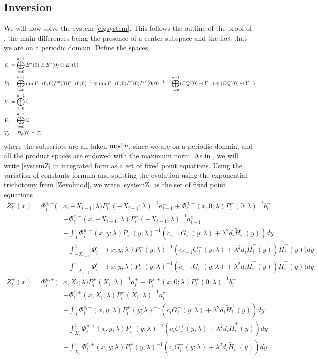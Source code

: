 \documentclass[10pt,reqno]{amsart}
\theoremstyle{plain}
\theoremstyle{definition}
\theoremstyle{remark}
\numberwithin{theorem}{section}
\numberwithin{equation}{section}
\begin{document}
\subsection{Inversion}

We will now solve the system \cref{eigsystem}. This follows the outline of the proof of \cite[Theorem 2]{Sandstede1998}, the main differences being the presence of a center subspace and the fact that we are on a periodic domain. Define the spaces
\begin{align*}
V_a &= \bigoplus_{i=0}^{n-1} E^u(0) \oplus E^s(0) \oplus E^c(0) \\
V_b &= \bigoplus_{i=0}^{n-1} \operatorname{ran} P^-(0; 0) P^u(0) P^-(0; 0)^{-1} \oplus \operatorname{ran} P^+(0; 0) P^s(0) P^+(0; 0)^{-1} = \bigoplus_{i=0}^{n-1} (\mathbb{C} Q'(0)\oplus Y^-)\oplus(\mathbb{C} Q'(0)\oplus Y^+)\\
V_c &= \bigoplus_{i=0}^{n-1} \mathbb{C} \\
V_d &= \bigoplus_{i=0}^{n-1} \mathbb{C} \\
V_\lambda &= B_\delta(0) \subset \mathbb{C}
\end{align*}
where the subscripts are all taken $\mathop\mathrm{mod}\nolimits n$, since we are on a periodic domain, and all the product spaces are endowed with the maximum norm. As in \cite{Sandstede1998}, we will write \eqref{systemZ} in integrated form as a set of fixed point equations. Using the variation of constants formula and splitting the evolution using the exponential trichotomy from \cref{Zevolmod}, we write \eqref{systemZ} as the set of fixed point equations
\begin{equation}\label{Zfpeq}
\begin{aligned}
Z_i^-(x) = \Phi_i^{s,-}(&x, -X_{i-1}; \lambda) P_i^-(-X_{i-1}; \lambda)^{-1} a_{i-1}^- + \Phi_i^{u,-}(x, 0; \lambda) P_i^-(0; \lambda)^{-1} b_i^- \\
&- \Phi_i^{c,-}(x, -X_{i-1}; \lambda) P_i^-(-X_{i-1}; \lambda)^{-1} a_{i-1}^c \\
&+ \int_0^x \Phi_i^{u,-}(x, y; \lambda)P_i^-(y; \lambda)^{-1}(c_{i-1} G_i^-(y; \lambda) + \lambda^2 d_i \tilde{H}_i^-(y)) dy \\
&+ \int_{-X_{i-1}}^x \Phi_i^{s,-}(x, y; \lambda) P_i^-(y; \lambda)^{-1} (c_{i-1} G_i^-(y; \lambda) + \lambda^2 d_i \tilde{H}_i^-(y)) \tilde{H}_i^-(y)) dy \\
&+ \int_{-X_{i-1}}^x \Phi_i^{c,-}(x, y; \lambda) P_i^-(y; \lambda)^{-1} (c_{i-1} G_i^-(y; \lambda) + \lambda^2 d_i \tilde{H}_i^-(y)) \tilde{H}_i^-(y)) dy  \\ 
Z_i^+(x) = \Phi_i^{u,+}(&x, X_i; \lambda) P_i^+(X_i; \lambda)^{-1} a_i^+ + \Phi_i^{s,+}(x, 0; \lambda) P_i^+(0; \lambda)^{-1} b_i^+ \\
&+ \Phi_i^{c,+}(x, X_i; \lambda) P_i^+(X_i; \lambda)^{-1} a_i^c \\
&+ \int_0^x \Phi_i^{s,+}(x, y; \lambda) P_i^+(y; \lambda)^{-1} (c_i G_i^+(y; \lambda) + \lambda^2 d_i \tilde{H}_i^+(y)) dy \\
&+ \int_{X_i}^x \Phi_i^{u,+}(x, y; \lambda) P_i^+(y; \lambda)^{-1}( c_i G_i^+(y; \lambda) + \lambda^2 d_i \tilde{H}_i^+(y)) dy \\
&+ \int_{X_i}^x \Phi_i^{c,+}(x, y; \lambda) P_i^+(y; \lambda)^{-1}( c_i G_i^+(y; \lambda) + \lambda^2 d_i \tilde{H}_i^+(y)) dy 
\end{aligned}
\end{equation}
\end{document}
